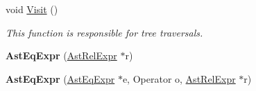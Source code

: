\begin{DoxyCompactItemize}
\item 
void \hyperlink{classAstEqExpr_a6e0e9e88f6801eb135efef5bb5fe2851}{Visit} ()
\begin{DoxyCompactList}\small\item\em This function is responsible for tree traversals. \end{DoxyCompactList}\item 
\hypertarget{classAstEqExpr_ae59f45e93845f531132980db8e8b8e2b}{{\bfseries Ast\-Eq\-Expr} (\hyperlink{classAstRelExpr}{Ast\-Rel\-Expr} $\ast$r)}\label{classAstEqExpr_ae59f45e93845f531132980db8e8b8e2b}

\item 
\hypertarget{classAstEqExpr_aac47a62e5410c55ac1f645a699e05ec4}{{\bfseries Ast\-Eq\-Expr} (\hyperlink{classAstEqExpr}{Ast\-Eq\-Expr} $\ast$e, Operator o, \hyperlink{classAstRelExpr}{Ast\-Rel\-Expr} $\ast$r)}\label{classAstEqExpr_aac47a62e5410c55ac1f645a699e05ec4}


\end{DoxyCompactItemize}
